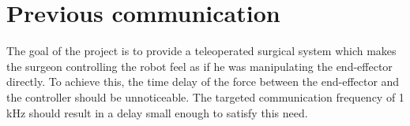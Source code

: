 \chapter{Previous communication}\label{cha:prev_communication} 

The goal of the project is to provide a teleoperated surgical system which makes the surgeon controlling the robot feel as if he was manipulating the end-effector directly. To achieve this, the time delay of the force between the end-effector and the controller should be unnoticeable. The targeted communication frequency of 1 kHz should result in a delay small enough to satisfy this need.






















